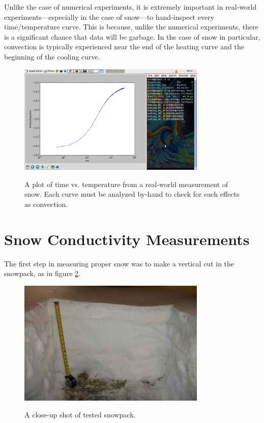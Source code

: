 Unlike the case of numerical experiments, it is extremely important in
real-world experiments---especially in the case of snow---to hand-inspect every
time/temperature curve. This is because, unlike the numerical experiments, there
is a significant chance that data will be garbage. In the case of snow in
particular, convection is typically experienced near the end of the heating
curve and the beginning of the cooling curve.

\begin{figure}[h]
\centering
\includegraphics[width=0.8\textwidth]{fig/measurement_graph.png}
\label{fig:meas_graph}
\caption{A plot of time vs. temperature from a real-world measurement of snow.
Each curve must be analyzed by-hand to check for such effects as convection.}
\end{figure}



\section{Snow Conductivity Measurements}

The first step in measuring proper snow was to make a vertical cut in the
snowpack, as in figure \ref{fig:snowpack}.

\begin{figure}[h]
\centering
\includegraphics[width=0.8\textwidth]{fig/snowpack.jpg}
\label{fig:snowpack}
\caption{A close-up shot of tested snowpack.}
\end{figure}

